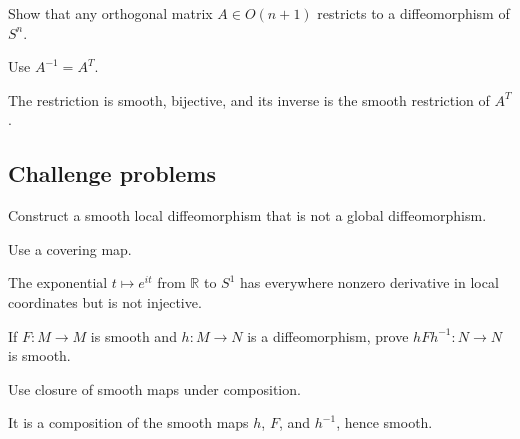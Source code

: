 \begin{exercise}\label{exr:vii03-ped-14}
Show that any orthogonal matrix \(A\in O(n+1)\) restricts to a diffeomorphism of \(S^n\).
\end{exercise}
\begin{hint}
Use \(A^{-1}=A^T\).
\end{hint}
\begin{solution}
The restriction is smooth, bijective, and its inverse is the smooth restriction of \(A^T\).
\end{solution}

\subsection*{Challenge problems}

\begin{exercise}\label{exr:vii03-ped-15}
Construct a smooth local diffeomorphism that is not a global diffeomorphism.
\end{exercise}
\begin{hint}
Use a covering map.
\end{hint}
\begin{solution}
The exponential \(t\mapsto e^{it}\) from \(\mathbb R\) to \(S^1\) has everywhere nonzero derivative in local coordinates but is not injective.
\end{solution}

\begin{exercise}\label{exr:vii03-ped-16}
If \(F:M\to M\) is smooth and \(h:M\to N\) is a diffeomorphism, prove \(hFh^{-1}:N\to N\) is smooth.
\end{exercise}
\begin{hint}
Use closure of smooth maps under composition.
\end{hint}
\begin{solution}
It is a composition of the smooth maps \(h\), \(F\), and \(h^{-1}\), hence smooth.
\end{solution}

